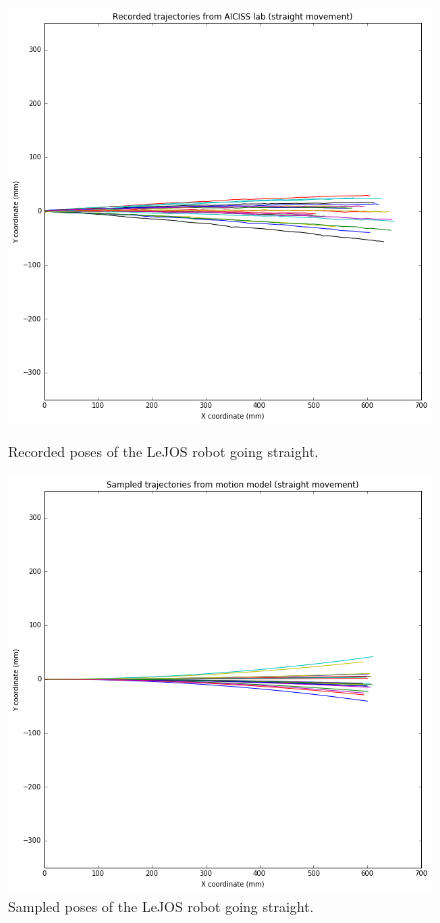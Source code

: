 \documentclass[paper=a4, fontsize=11pt]{scrartcl} %
\begin{document}
	\begin{figure}[h!]
		\centering
		\begin{minipage}{0.45\textwidth}
			\centering
			\includegraphics[width=1\textwidth]{images/recorded_poses_straight.png} %
			\caption{Recorded poses of the LeJOS robot going straight.}
		\end{minipage}\hfill
		\begin{minipage}{0.45\textwidth}
			\centering
			\includegraphics[width=1\textwidth]{images/sampled_poses_straight.png} %
			\caption{Sampled poses of the LeJOS robot going straight.}
		\end{minipage}
	\end{figure}
\end{document}
